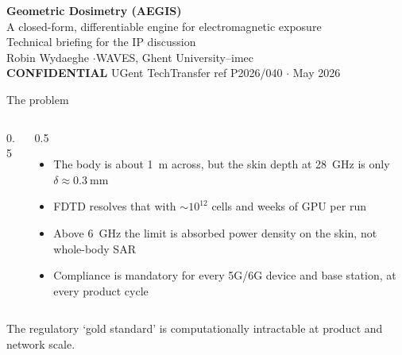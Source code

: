 \documentclass[aspectratio=169, 10pt]{beamer}
\begin{document}
\begin{frame}[plain]
  \vfill
  \begin{center}
    {\Large\color{navyblue}\bfseries Geometric Dosimetry (AEGIS)}\\[6pt]
    {\normalsize A closed-form, differentiable engine for electromagnetic exposure}\\[14pt]
    {\small Technical briefing for the IP discussion}\\[2pt]
    {\footnotesize Robin Wydaeghe \quad$\cdot$\quad WAVES, Ghent University--imec}\\[10pt]
    {\footnotesize\color{alertred}\textbf{CONFIDENTIAL}}\quad
    {\footnotesize\color{darkgray} UGent TechTransfer ref P2026/040 \quad$\cdot$ May 2026}
  \end{center}
  \vfill
\end{frame}


\begin{frame}{The problem}
  \begin{columns}[T]
    \begin{column}{0.5\textwidth}
    \end{column}
    \begin{column}{0.5\textwidth}
      \begin{itemize}
        \item The body is about \SI{1}{\metre} across, but the skin depth at \SI{28}{\giga\hertz} is only $\delta\!\approx\!\SI{0.3}{\milli\metre}$
        \item FDTD resolves that with $\sim 10^{12}$ cells and weeks of GPU per run
      \end{itemize}
      \vspace{8pt}
      \begin{itemize}
        \item Above \SI{6}{\giga\hertz} the limit is absorbed power density on the skin, not whole-body SAR
        \item Compliance is mandatory for every 5G/6G device and base station, at every product cycle
      \end{itemize}
    \end{column}
  \end{columns}
  \vspace{3pt}
  \begin{resultbox}\centering
    The regulatory `gold standard' is computationally intractable at product and network scale.
  \end{resultbox}
\end{frame}
\end{document}
